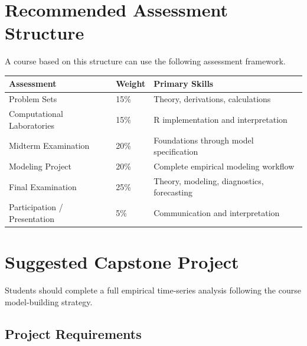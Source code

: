 \documentclass[11pt,a4paper]{article}
\begin{document}
\section{Recommended Assessment Structure}

A course based on this structure can use the following assessment framework.

\begin{longtable}{p{}p{}p{}}
\toprule
\textbf{Assessment} & \textbf{Weight} & \textbf{Primary Skills} \\
\midrule
Problem Sets & 15\% &
Theory, derivations, calculations \\

Computational Laboratories & 15\% &
R implementation and interpretation \\

Midterm Examination & 20\% &
Foundations through model specification \\

Modeling Project & 20\% &
Complete empirical modeling workflow \\

Final Examination & 25\% &
Theory, modeling, diagnostics, forecasting \\

Participation / Presentation & 5\% &
Communication and interpretation \\
\bottomrule
\end{longtable}

\section{Suggested Capstone Project}

Students should complete a full empirical time-series analysis following the
course model-building strategy.

\subsection{Project Requirements}
\end{document}

